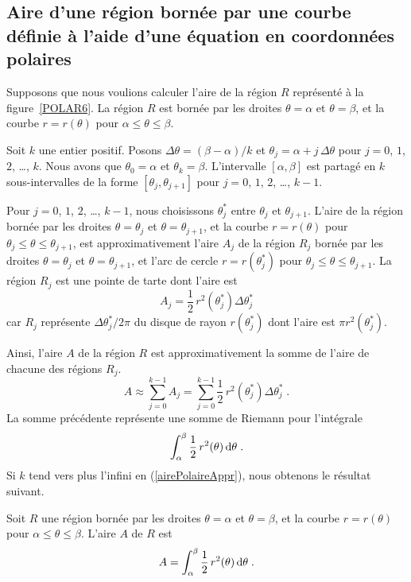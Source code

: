 {\subsection[Aire d'une région]{Aire d'une région bornée par une courbe  définie à l'aide d'une équation en coordonnées polaires}

Supposons que nous voulions calculer l'aire de la région $R$
représenté à la figure~\ref{POLAR6}.  La région $R$ est bornée par les
droites $\theta=\alpha$ et $\theta = \beta$, et la courbe
$r=r(\theta)$ pour $\alpha \leq \theta \leq \beta$. 

Soit $k$ une entier positif.  Posons $\Delta \theta =(\beta-\alpha)/k$
et $\theta_j = \alpha + j\,\Delta \theta$ pour $j=0$, $1$, $2$,
\ldots, $k$.  Nous avons que $\theta_0=\alpha$ et $\theta_k = \beta$.
L'intervalle $[\alpha,\beta]$ est partagé en $k$ sous-intervalles de la
forme $[\theta_j,\theta_{j+1}]$ pour $j=0$, $1$, $2$, \ldots, $k-1$.

Pour $j=0$, $1$, $2$, \ldots, $k-1$, nous choisissons $\theta_j^\ast$ entre
$\theta_j$ et $\theta_{j+1}$.  L'aire de la région bornée par les
droites $\theta=\theta_j$ et $\theta=\theta_{j+1}$, et la courbe
$r=r(\theta)$ pour $\theta_j \leq \theta \leq \theta_{j+1}$, est
approximativement l'aire $A_j$ de la région $R_j$ bornée par les
droites $\theta=\theta_j$ et $\theta=\theta_{j+1}$, et l'arc de cercle
$r=r(\theta_j^\ast)$ pour $\theta_j \leq \theta \leq \theta_{j+1}$.
La région $R_j$ est une pointe de tarte dont l'aire est
\[
A_j = \frac{1}{2}\,r^2(\theta_j^\ast) \Delta \theta_j^\ast
\]
car $R_j$ représente $\Delta \theta_j^\ast/2\pi$ du disque de rayon
$r(\theta_j^\ast)$ dont l'aire est $\displaystyle \pi r^2(\theta_j^\ast)$.

Ainsi, l'aire $A$ de la région $R$ est approximativement la somme de
l'aire de chacune des régions $R_j$.
\begin{equation} \label{airePolaireAppr}
A \approx \sum_{j=0}^{k-1} A_j = \sum_{j=0}^{k-1}
\frac{1}{2}\,r^2(\theta_j^\ast) \Delta \theta_j^\ast \; .
\end{equation}
La somme précédente représente une somme de Riemann pour l'intégrale
\[
\int_\alpha^\beta \frac{1}{2}\, r^2(\theta) \,\mathrm{d}\theta \; .
\]
Si $k$ tend vers plus l'infini en (\ref{airePolaireAppr}), nous obtenons
le résultat suivant.

\begin{prop}
Soit $R$ une région bornée par les droites $\theta=\alpha$ et
$\theta = \beta$, et la courbe $r=r(\theta)$ pour
$\alpha \leq \theta \leq \beta$.  L'aire $A$ de $R$ est
\[
A = \int_\alpha^\beta \frac{1}{2}\, r^2(\theta) \,\mathrm{d}\theta \; .
\]
\end{prop}

}

